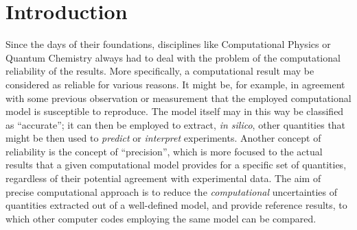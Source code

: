 \documentclass[reprint,aps,prb]{revtex4-1}
\begin{document}
\begin{abstract}

\end{abstract}

\maketitle

\section{Introduction}
Since the days of their foundations, disciplines like Computational Physics or Quantum Chemistry always had to deal with the problem of the 
computational reliability of the results. More specifically, a computational result may be considered as reliable for various reasons.
It might be, for example, in agreement with some previous observation or measurement that the employed computational model is susceptible to reproduce.
The model itself may in this way be classified as ``accurate''; it can then be employed to extract, \textit{in silico},
other quantities that might be then used to \emph{predict} or \emph{interpret} experiments.
Another concept of reliability is the concept of  ``precision'', which is more focused to the actual results
that a given computational model provides for a specific set of quantities, regardless of their potential agreement with 
experimental data. The aim of precise computational approach is to reduce the \emph{computational} uncertainties
of quantities extracted out of a well-defined model, and provide reference results, to which other computer codes
employing the same model can be compared.
\end{document}
